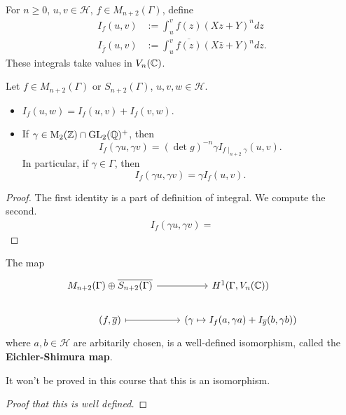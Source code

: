 \begin{definition}
    For $n\ge 0$, $u, v\in \mathcal{H}$, $f\in M_{n+2}(\Gamma)$,
    define \begin{align*}
        I_f(u, v) &:= \int_u^v f(z) (Xz + Y)^n dz\\
        I_{\bar{f}}(u, v) &:=
        \int_u^v \overline{f(z)}(X\bar{z} + Y)^n dz.
    \end{align*}
    These integrals take values in $V_n(\mathbb{C})$.
\end{definition}
\begin{lemma}\label{lem: property of If(u v)}
    Let $f\in M_{n+2}(\Gamma)$ or $S_{n+2}(\Gamma)$, $u, v, w\in\mathcal{H}$.\begin{itemize}
        \item $I_f(u, w) = I_f(u, v) + I_f(v, w)$.
        \item If $\gamma\in \mathrm{M}_2(\mathbb{Z})\cap\operatorname{GL}_2(\mathbb{Q})^+$,
        then \[I_f(\gamma u, \gamma v) = \left( \det g \right)^{-n}\gamma I_{f\mid_{n+2}\gamma}(u, v).\]
        In particular, if $\gamma\in\Gamma$, then \[I_f(\gamma u, \gamma v) = \gamma I_f(u, v).\]
    \end{itemize}
\end{lemma}
\begin{proof}
    The first identity is a part of definition of integral.
    We compute the second.
    \begin{align*}
        I_f(\gamma u, \gamma v) = 
    \end{align*}
\end{proof}

\begin{theorem}
    The map
\[\begin{tikzcd}
	{M_{n+2}(\Gamma)\oplus \overline{S_{n+2}(\Gamma)}} & {H^1(\Gamma, V_n(\C))} \\
	{(f, \bar{g})} & {\left( \gamma\mapsto I_f(a, \gamma a) + I_{\bar{g}}(b, \gamma b) \right)}
	\arrow[from=1-1, to=1-2]
	\arrow[maps to, from=2-1, to=2-2]
\end{tikzcd}\]
where $a, b\in\mathcal{H}$ are arbitarily chosen, is a well-defined isomorphism, called the \textbf{Eichler-Shimura map}.
\end{theorem}
It won't be proved in this course that this is an isomorphism.
\begin{proof}
    [Proof that this is well defined]
\end{proof}


















